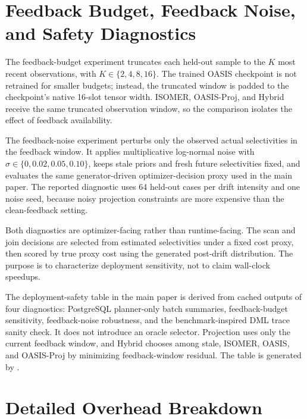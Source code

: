 \documentclass[runningheads]{llncs}
\begin{document}
\section{Feedback Budget, Feedback Noise, and Safety Diagnostics}
\label{sec:feedback-sensitivity-app}

The feedback-budget experiment truncates each held-out sample to the $K$ most
recent observations, with $K\in\{2,4,8,16\}$. The trained OASIS checkpoint is
not retrained for smaller budgets; instead, the truncated window is padded to
the checkpoint's native 16-slot tensor width. ISOMER, OASIS-Proj, and Hybrid
receive the same truncated observation window, so the comparison isolates the
effect of feedback availability.

The feedback-noise experiment perturbs only the observed actual selectivities
in the feedback window. It applies multiplicative log-normal noise with
$\sigma\in\{0,0.02,0.05,0.10\}$, keeps stale priors and fresh future
selectivities fixed, and evaluates the same generator-driven
optimizer-decision proxy used in the main paper. The reported diagnostic uses
64 held-out cases per drift intensity and one noise seed, because noisy
projection constraints are more expensive than the clean-feedback setting.

Both diagnostics are optimizer-facing rather than runtime-facing. The scan and
join decisions are selected from estimated selectivities under a fixed cost
proxy, then scored by true proxy cost using the generated post-drift
distribution. The purpose is to characterize deployment sensitivity, not to
claim wall-clock speedups.

The deployment-safety table in the main paper is derived from cached outputs of
four diagnostics: PostgreSQL planner-only batch summaries, feedback-budget
sensitivity, feedback-noise robustness, and the benchmark-inspired DML trace
sanity check. It does not introduce an oracle selector. Projection uses only the
current feedback window, and Hybrid chooses among stale, ISOMER, OASIS, and
OASIS-Proj by minimizing feedback-window residual. The table is generated by
.

\section{Detailed Overhead Breakdown}
\label{sec:overhead-app}
\end{document}
